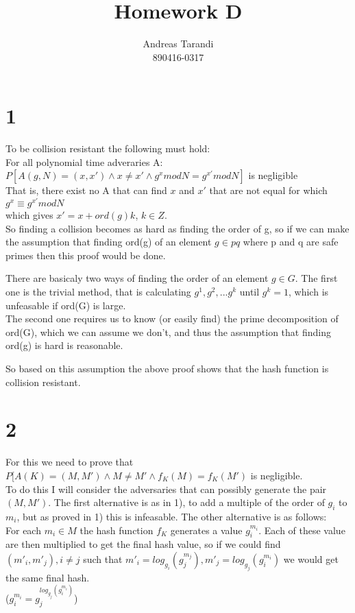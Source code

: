 \documentclass[a4paper,11pt]{article}
\author{Andreas Tarandi\\890416-0317}
\title{Homework D}
\begin{document}
	\maketitle

	\section*{1 }
		To be collision resistant the following must hold:\\
		For all polynomial time adveraries A:
		$P[A(g, N) = (x, x') \wedge x \neq x' \wedge g^x mod N = g^{x'} mod N]$ is negligible\\
		That is, there exist no A that can find $x$ and $x'$ that are not equal for which\\
		$g^x \equiv g^{x'} mod N$\\
		which gives $x' = x + ord(g)k$, $k \in Z$.\\
		So finding a collision becomes as hard as finding the order of g, so if we can make the assumption that finding ord(g) of an element $g \in pq$ where p and q are safe primes then this proof would be done.

		There are basicaly two ways of finding the order of an element $g \in G$. The first one is the trivial method, that is calculating
		$g^1, g^2, ... g^k$ until $g^k = 1$, which is unfeasable if ord(G) is large. \\
		The second one requires us to know (or easily find) the prime decomposition of ord(G), which we can assume we don't, and thus the 
		assumption that finding ord(g) is hard is reasonable.

		So based on this assumption the above proof shows that the hash function is collision resistant.

	\section*{2}
		For this we need to prove that
		$P[A(K) = (M, M') \wedge M \neq M' \wedge f_K(M) = f_K(M')$ is negligible.\\
		To do this I will consider the adversaries that can possibly generate the pair $(M, M')$. The first alternative is as in 1), to
		add a multiple of the order of $g_i$ to $m_i$, but as proved in 1) this is infeasable. 
		The other alternative is as follows:\\
		For each $m_i \in M$ the hash function $f_K$ generates a value $g_i^{m_i}$. Each of these value are then multiplied to get the
		final hash value, so if we could find $(m'_i, m'_j), i \neq j$ such that $m'_i = log_{g_i}(g_j^{m_j}), m'_j = log_{g_j}(g_i^{m_i})$ 
		we would get the same final hash. \\
		($g_i^{m_i} = g_j^{log_{g_j}(g_i^{m_i})}$)\\
\end{document}

